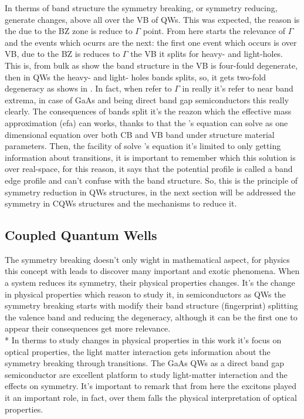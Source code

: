 In therms of band structure the symmetry breaking, or symmetry reducing, generate changes, above all over the VB of QWs. This was expected, the reason is the due to the \gls{BZ} zone is reduce to $\Gamma$ point. From here starts the relevance of $\Gamma$ and the events which ocurrs are the next: the first one event which occurs is over VB, due to the \gls{BZ} is reduces to  $\Gamma$ the \gls{VB} it splits for heavy- and light-holes. This is, from bulk as show the band structure in  the \gls{VB} is four-fould degenerate, then in QWs the heavy- and light- holes bands splits, so,  it gets two-fold degeneracy as shows in . In fact, when refer to $\Gamma$ in really it's refer to near band extrema, in case of GaAs and \algaas  being direct band gap semiconductors this really clearly. The consequences of bands split it's the reazon which the effective mass approximation (\gls{efa}) can works, thanks to that the  \sch's equation can solve as one dimensional equation over both \gls{CB} and \gls{VB} band  under structure material parameters. 
Then, the facility of solve \sch's equation it's limited to only getting information about transitions, it is important to remember which this solution is over real-space, for this reason, it says that the potential profile is called a band edge profile and can't confuse with the band structure. So, this is the principle of symmetry reduction in QWs structures, in the next section will be addressed the symmetry in CQWs structures and the mechanisms to reduce it. 





\subsection{Coupled Quantum Wells}
\label{subsubsec:chapter-2-coupled-quantum-wells}
\vspace{-10mm}
The symmetry breaking doesn't only wight in mathematical aspect, for physics this concept with leads to discover many important and exotic phenomena. When a system reduces its symmetry, their physical properties changes. It's the change in physical properties which reason to study it, in semiconductors as QWs the symmetry breaking starts with modify their band structure (fingerprint) splitting the valence band and reducing the degeneracy, although it  can be the first one to appear  their consequences get more relevance. \\*
In therms to study changes in physical properties in this work it's focus on optical properties, the light matter interaction gets information about the symmetry breaking through transitions.  The GaAs QWs as a direct band gap semiconductor are excellent platform to study light-matter interaction and the effects on symmetry. It's important to remark  that from here the excitons  played it  an important role, in fact, over them falls  the physical interpretation of optical properties.  

